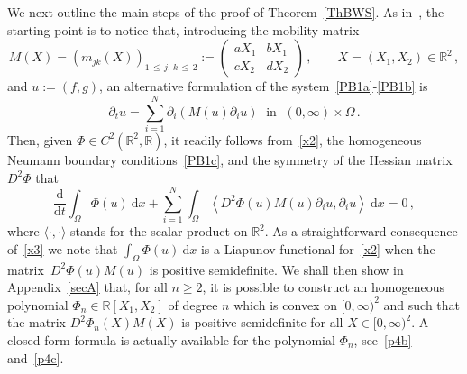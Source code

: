 \documentclass[AHL,Unicode,longabstracts,published]{cedram}
\newcommand{\bbR}{\mathbb{R}}
\newcommand{\rmd}{\mathrm{d}}
\begin{document}
We next outline the main steps of the proof of Theorem~\ref{ThBWS}. As in~\cite{LM22}, the starting point is to notice that, introducing the mobility matrix
\begin{equation}\label{x1}
M(X) = \left(m_{jk}(X)\right)_{1\,\le\,j,\,k\,\le \,2} :=
\begin{pmatrix}
a X_1& b X_1 \\
c X_2 & d X_2
\end{pmatrix}\,, \qquad X=(X_1,X_2)\in \bbR^2\,, 
\end{equation}
and $u:=(f,g)$, an alternative formulation of the system~\eqref{PB1a}-\eqref{PB1b} is
\begin{equation}\label{x2}
\partial_t u = \sum_{i=1}^N\partial_i (M(u)\partial_i u) \;\text{ in }\; (0,\infty)\times \Omega\,. 
\end{equation}
Then, given $\Phi\in C^2(\bbR^2,\bbR)$, it readily follows from~\eqref{x2}, the homogeneous Neumann boundary conditions~\eqref{PB1c}, and the symmetry of the Hessian matrix $D^2\Phi$ that
\begin{equation}\label{x3}
\frac{\rmd }{\rmd t} \int_\Omega \Phi(u)\ \rmd x + \sum_{i=1}^N\int_\Omega \left\langle D^2\Phi(u) M(u) \partial_i u, \partial_i u \right\rangle\ \rmd x = 0\,, 
\end{equation}
where $\langle \cdot,\cdot \rangle$ stands for the scalar product on $\bbR^2$. As a straightforward consequence of~\eqref{x3} we note that $\int_\Omega \Phi(u)\ \rmd x$ is a Liapunov functional for~\eqref{x2} when the matrix~${D^2\Phi(u) M(u)}$ is positive semidefinite. We shall then show in Appendix~\ref{secA} that, for all $n\ge 2$, it is possible to construct an homogeneous polynomial $\Phi_n\in \bbR[X_1,X_2]$ of degree $n$ which is convex on $[0,\infty)^2$ and such that the matrix $D^2\Phi_n(X) M(X)$ is positive semidefinite for all $X\in [0,\infty)^2$. A closed form formula is actually available for the polynomial $\Phi_n$, see~\eqref{p4b} and~\eqref{p4c}.
\end{document}
